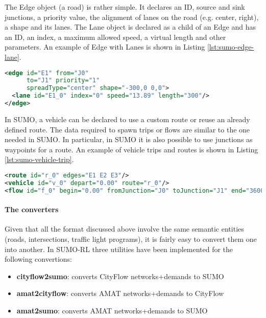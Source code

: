 The Edge object (a road) is rather simple. It declares an ID, source and sink junctions, a priority value, the alignment of lanes on the road (e.g. center, right), a shape and its lanes.
The Lane object is declared as a child of an Edge and has an ID, an index, a maximum allowed speed, a virtual length and other parameters.
An example of Edge with Lanes is shown in Listing \ref{lst:sumo-edge-lane}.

\noindent
\begin{minipage}{\linewidth}
\begin{lstlisting}[language=XML, caption=Example of Edge declaration in SUMO format, label={lst:sumo-edge-lane}]
<edge id="E1" from="J0"
      to="J1" priority="1"
      spreadType="center" shape="-300,0 0,0">
  <lane id="E1_0" index="0" speed="13.89" length="300"/>
</edge>
\end{lstlisting}
\end{minipage}

In SUMO, a vehicle can be declared to use a custom route or reuse an already defined route.
The data required to spawn trips or flows are similar to the one needed in SUMO.
In particular, in SUMO it is also possible to use junctions as waypoints for a route.
An example of vehicle trips and routes is shown in Listing \ref{lst:sumo-vehicle-trip}.

\noindent
\begin{minipage}{\linewidth}
\begin{lstlisting}[language=XML, caption=Example of vehicle trip and route declaration in SUMO format, label={lst:sumo-vehicle-trip}]
<route id="r_0" edges="E1 E2 E3"/>
<vehicle id="v_0" depart="0.00" route="r_0"/>
<flow id="f_0" begin="0.00" fromJunction="J0" toJunction="J1" end="3600.00" vehsPerHour="1800"/>
\end{lstlisting}
\end{minipage}

\paragraph{The converters}

Given that all the format discussed above involve the same semantic entities (roads, intersections, traffic light programs), it is fairly easy to convert them one into another.
In SUMO-RL three utilities have been implemented for the following convertions:

\begin{itemize}
  \item \textbf{cityflow2sumo}: converts CityFlow networks+demands to SUMO
  \item \textbf{amat2cityflow}: converts AMAT networks+demands to CityFlow
  \item \textbf{amat2sumo}: converts AMAT networks+demands to SUMO
\end{itemize}

